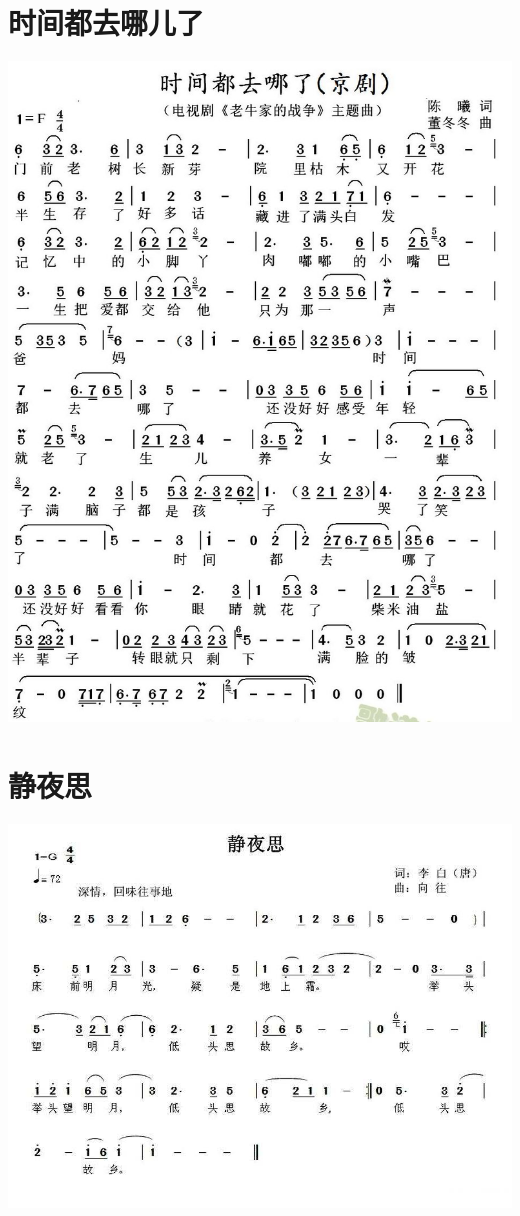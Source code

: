 \documentclass[cn,pad,chinese,chinesefont=nofont,math=newtx]{elegantbook}
\begin{document}
\section{时间都去哪儿了}
    \includegraphics[width=\textwidth]{dongxiao/20200411-时间都去哪儿了.jpg} 
\section{静夜思}
    \includegraphics[width=\textwidth]{dongxiao/20200411-静夜思.jpg}
\end{document}
